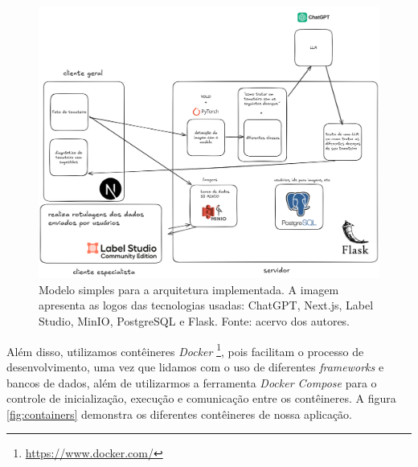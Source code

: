 \begin{figure}[htbp]
    \centering
    \includegraphics[width=1\linewidth]{images/modelo.png}
    \caption{\label{fig:modelo_arq} Modelo simples para a arquitetura implementada. A imagem apresenta as logos das tecnologias usadas: ChatGPT, Next.js, Label Studio, MinIO, PostgreSQL e Flask. Fonte: acervo dos autores.}
\end{figure}

Além disso, utilizamos contêineres \emph{Docker} \footnote{\url{https://www.docker.com/}}, pois facilitam o processo de desenvolvimento, uma vez que lidamos com o uso de diferentes \textit{frameworks} e bancos de dados, além de utilizarmos a ferramenta \emph{Docker Compose} para o controle de inicialização, execução e comunicação entre os contêineres. A figura \ref{fig:containers} demonstra os diferentes contêineres de nossa aplicação.

